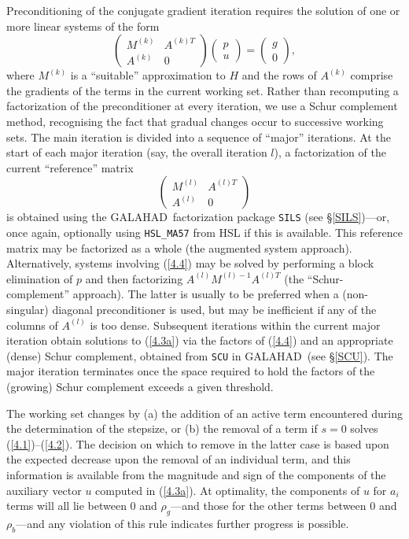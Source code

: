 \documentclass[acmtocl,acmnow]{acmtrans2m}
\newcommand{\req}[1]{(\ref{#1})}
\newcommand{\gal}{{\sf GALAHAD}}
\newcommand{\eqn}[2]{\begin{equation}\label{#1}{#2}\end{equation}}
\newcommand{\vect}[1]{\left(\begin{array}{c}#1\end{array}\right)}
\newcommand{\mat}[2]{\left(\begin{array}{#1}#2\end{array}\right)}
\begin{document}
Preconditioning of the conjugate gradient iteration
requires the solution of one or more linear systems of the form
\eqn{4.3a}{\mat{cc}{M^{(k)} & A^{(k)T} \\ A^{(k)} & 0 }
\vect{ p \\ u} = \vect{ g \\ 0 },}
where $M^{(k)}$ is a ``suitable'' approximation to $H$
and the rows of $A^{(k)}$ comprise the gradients of the
terms in the current working set. Rather than recomputing a
factorization of the preconditioner at every iteration, we use a
Schur complement method, recognising the fact that
gradual changes occur to successive working sets. The main
iteration is divided into a sequence of ``major'' iterations.
At the start of each major iteration (say, the overall iteration $l$), 
a factorization of the
current ``reference'' matrix
\eqn{4.4}{\mat{cc}{M^{(l)} & A^{(l)T} \\ A^{(l)} & 0 }}
is obtained using  the \gal\ factorization package
{\tt SILS} (see \S\ref{SILS})---or, once again, 
optionally using {\tt HSL\_MA57} from HSL if this is available.
This reference matrix may be factorized as a whole (the
augmented system approach). Alternatively, systems involving \req{4.4} may 
be solved by performing a block elimination of $p$ 
and then factorizing $A^{(l)} M^{(l)-1} A^{(l)T}$
(the ``Schur-complement'' approach). The latter is usually to be preferred 
when a (non-singular) diagonal 
preconditioner is used, but may be inefficient if any of the columns
of $A^{(l)}$ is too dense.
Subsequent iterations within the current major
iteration obtain solutions to \req{4.3a} via the factors of \req{4.4}
and an appropriate (dense) Schur complement,
obtained from {\tt SCU} in \gal\ (see \S\ref{SCU}).
The major iteration terminates
once the space required to hold the factors of the (growing) Schur
complement exceeds a given threshold.

The working set changes by (a) 
the addition of an active term encountered during 
the determination of the stepsize, or (b) the removal of a term if $s = 0$
solves \req{4.1}--\req{4.2}. The  decision on which to remove in the latter 
case is based upon the expected decrease upon the removal of an individual term,
and this information is available from the magnitude and sign of the components
of the auxiliary vector $u$ computed in \req{4.3a}. At optimality, the
components of $u$ for $a_i$ terms will all lie between 
$0$ and $\rho_g$---and those for the other terms 
between $0$ and $\rho_b$---and any violation
of this rule indicates further progress is possible. 
\end{document}

